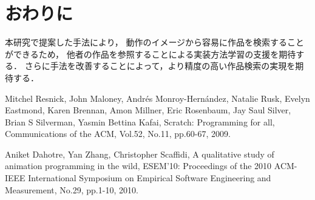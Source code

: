 \documentclass[twocolumn]{jarticle} %
\begin{document}
\section{おわりに}
本研究で提案した手法により，
動作のイメージから容易に作品を検索することができるため，
他者の作品を参照することによる実装方法学習の支援を期待する．
さらに手法を改善することによって，より精度の高い作品検索の実現を期待する．





\begin{thebibliography}{9}	%
				
Mitchel Resnick, John Maloney, Andr\'{e}s Monroy-Hern\'{a}ndez, Natalie Rusk, Evelyn Eastmond, Karen Brennan, 
Amon Millner, Eric Rosenbaum, Jay Saul Silver, Brian S Silverman, Yasmin Bettina Kafai,
Scratch: Programming for all,
Communications of the ACM, Vol.52, No.11, pp.60-67, 2009.

Aniket Dahotre, Yan Zhang, Christopher Scaffidi,
A qualitative study of animation programming in the wild,
ESEM'10: Proceedings of the 2010 ACM-IEEE International Symposium on Empirical Software Engineering and Measurement,
No.29, pp.1-10, 2010.

\end{thebibliography}

\end{document}
